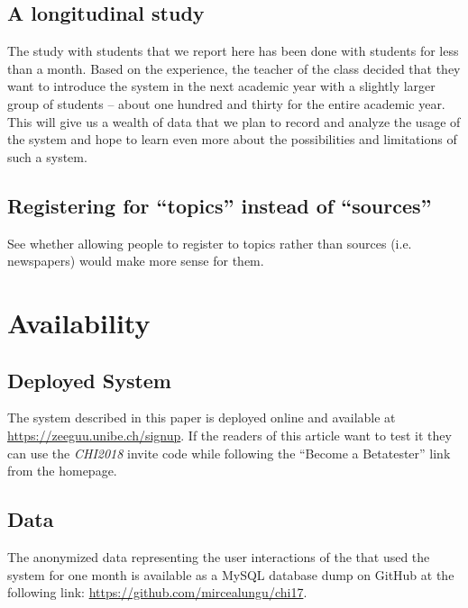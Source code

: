\subsection{A longitudinal study}
The study with students that we report here has been done with \stcnt students for less than a month. Based on the experience, the teacher of the class decided that they want to introduce the system in the next academic year with a slightly larger group of students -- about one hundred and thirty for the entire academic year. This will give us a wealth of data that we plan to record and analyze the usage of the system and hope to learn even more about the possibilities and limitations of such a system. 

\subsection{Registering for ``topics'' instead of ``sources''}
See whether allowing people to register to topics rather than sources (i.e. newspapers) would make more sense for them. 




\section{Availability}

\subsection{Deployed System}
The system described in this paper is deployed online and available at \url{https://zeeguu.unibe.ch/signup}. If the readers of this article want to test it they can use the {\em CHI2018} invite code while following the  ``Become a Betatester'' link from the homepage.

\subsection{Data}
The anonymized data representing the user interactions of the \students that used the system for one month is available as a MySQL database dump on GitHub at the following link: \url{https://github.com/mircealungu/chi17}.


